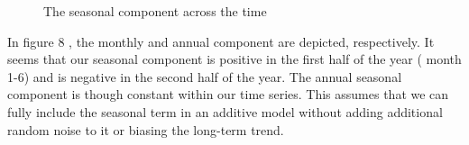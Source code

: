 \documentclass[10pt, a4paper]{article} %
\begin{document}
\begin{figure}[ht]
\begin{center}
\qquad
{}
\end{center}
\caption{The seasonal component across the time}
\label{seascomp}
\end{figure}

In figure 8 , the monthly and annual component are depicted, respectively. It seems that our seasonal component is positive in the first half of the year ( month 1-6) and is negative in the second half of the year. The annual seasonal component is though constant within our time series. This assumes that we can fully include the seasonal term in an additive model without adding additional random noise to it or biasing the long-term trend. 

\begin{Schunk}
\end{Schunk}
\end{document}
